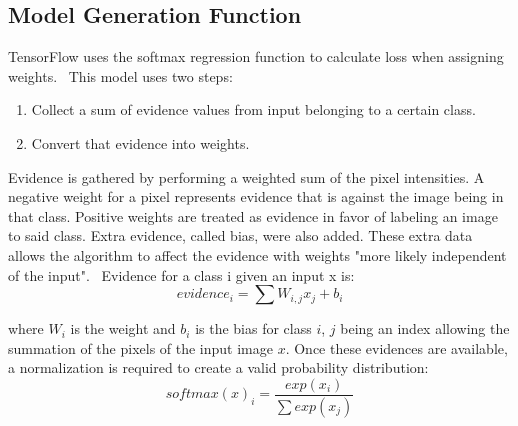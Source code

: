 \documentclass[11pt]{article}
\begin{document}

    
    
\subsection{Model Generation Function}
TensorFlow uses the softmax regression function to calculate loss when assigning weights.~\cite{mnist-for-ml-beginners17}  This model uses two steps:
\begin{enumerate}
  \item Collect a sum of evidence values from input belonging to a certain class.
  \item Convert that evidence into weights.
\end{enumerate}
Evidence is gathered by performing a weighted sum of the pixel intensities.  A negative weight for a pixel represents evidence that is against the image being in that class. Positive weights are treated as evidence in favor of labeling an image to said class.  Extra evidence, called bias, were also added.  These extra data allows the algorithm to affect the evidence with weights "more likely independent of the input".~\cite{mnist-for-ml-beginners17}  Evidence for a class i given an input x is:
\begin{equation}
    evidence_{i} = \sum W_{i,j}x_{j} + b_{i}
\end{equation}


where $W_{i}$ is the weight and $b_{i}$ is the bias for class $i$, $j$ being an index allowing the summation of the pixels of the input image $x$.  
Once these evidences are available, a normalization is required to create a valid probability distribution:
\begin{equation}
    softmax(x)_{i} = \frac{exp(x_{i})}{\sum exp(x_{j})}
\end{equation}

\end{document}
